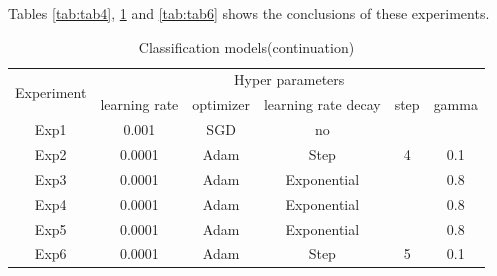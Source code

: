 Tables \ref{tab:tab4}, \ref{tab:tab5} and \ref{tab:tab6} shows the conclusions of these experiments.

\begin{table}[H]
    \centering
    \begin{tabular}{|c|c|c|c|c|c|}
     \hline
     \multirow{2}{5em}{Experiment}  & \multicolumn{5}{c|}{Hyper parameters} \\ \cline{2-6}
     & learning rate & optimizer & learning rate decay & step & gamma \\
     \hline \hline
     Exp1 & 0.001 & SGD & no &  &   \\
     \hline
     Exp2 & 0.0001 & Adam & Step & 4 & 0.1 \\
     \hline
     Exp3 & 0.0001 & Adam & Exponential & & 0.8\\
     \hline
     Exp4 & 0.0001 & Adam & Exponential & & 0.8\\
     \hline
     Exp5 & 0.0001 & Adam & Exponential & & 0.8\\
     \hline
     Exp6 & 0.0001 & Adam & Step & 5 & 0.1\\
     \hline
    \end{tabular}
    \caption{Classification models(continuation)}
    \label{tab:tab5}
\end{table}

